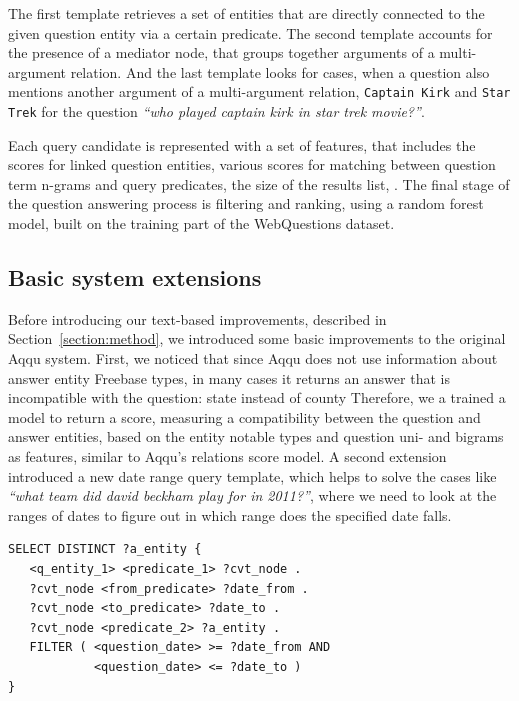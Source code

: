 The first template retrieves a set of entities that are directly connected to the given question entity via a certain predicate.
The second template accounts for the presence of a mediator node, that groups together arguments of a multi-argument relation.
And the last template looks for cases, when a question also mentions another argument of a multi-argument relation, \eg \texttt{Captain Kirk} and \texttt{Star Trek} for the question \textit{``who played captain kirk in star trek movie?''}.

Each query candidate is represented with a set of features, that includes the scores for linked question entities, various scores for matching between question term n-grams and query predicates, the size of the results list, \etc \cite{ACCU:2015}.
The final stage of the question answering process is filtering and ranking, using a random forest model, built on the training part of the WebQuestions dataset.

\subsection{Basic system extensions}
\label{sec:baseline:extensions}
Before introducing our text-based improvements, described in Section~\ref{section:method}, we introduced some basic improvements to the original Aqqu system.
First, we noticed that since Aqqu does not use information about answer entity Freebase types, in many cases it returns an answer that is incompatible with the question: \eg state instead of county \etc
Therefore, we a trained a model to return a score, measuring a compatibility between the question and answer entities, based on the entity notable types and question uni- and bigrams as features, similar to Aqqu's relations score model.
A second extension introduced a new date range query template, which helps to solve the cases like \textit{``what team did david beckham play for in 2011?''}, where we need to look at the ranges of dates to figure out in which range does the specified date falls.

\begin{lstlisting}[frame=single,basicstyle=\small]
SELECT DISTINCT ?a_entity {
   <q_entity_1> <predicate_1> ?cvt_node .
   ?cvt_node <from_predicate> ?date_from .
   ?cvt_node <to_predicate> ?date_to .
   ?cvt_node <predicate_2> ?a_entity .
   FILTER ( <question_date> >= ?date_from AND
            <question_date> <= ?date_to )
}
\end{lstlisting}



